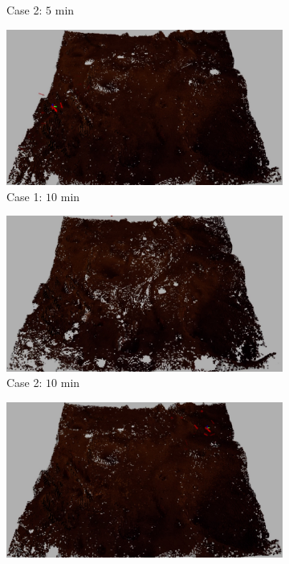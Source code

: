 \documentclass[conf]{new-aiaa}
\begin{document}
\begin{figure}[!t]
\begin{subfigure}[t]{0.4\columnwidth}
        		\caption{Case 2: $5$ min}
		\vspace*{0.025\textwidth}
    	\end{subfigure}
	\centering
	\begin{subfigure}[t]{0.4\columnwidth}
           	\centering
          	\includegraphics[height=0.5\textwidth]{MarsFullMap10min.jpg}
        		\caption{Case 1: $10$ min}
		\vspace*{0.025\textwidth}
    	\end{subfigure}
    	\begin{subfigure}[t]{0.4\columnwidth}
           	\centering
          	\includegraphics[height=0.5\textwidth]{MarsRdcdMap10min.jpg}
        		\caption{Case 2: $10$ min}
		\vspace*{0.025\textwidth}
    	\end{subfigure}
	\centering
	\begin{subfigure}[t]{0.4\columnwidth}
           	\centering
          	\includegraphics[height=0.5\textwidth]{MarsFullMap15min.jpg}

\end{subfigure}
\end{figure}
\end{document}
